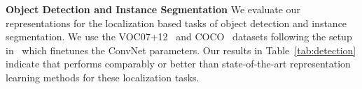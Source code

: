 \par \noindent \textbf{Object Detection and Instance Segmentation} We evaluate our representations for the localization based tasks of object detection and instance segmentation. We use the VOC07+12~\cite{everingham2010pascal} and COCO~\cite{lin2014microsoft} datasets following the setup in~\cite{he2019momentum} which finetunes the ConvNet parameters. Our results in Table~\ref{tab:detection} indicate that \AlgoName{} performs comparably or better than state-of-the-art representation learning methods for these localization tasks.







